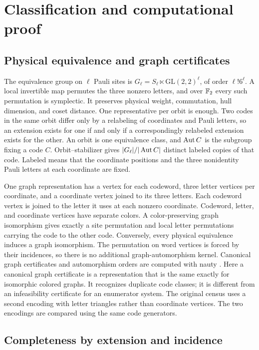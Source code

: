 \section{Classification and computational proof}\label{sec:computation}

\subsection{Physical equivalence and graph certificates}\label{sec:classification}

The equivalence group on \(\ell\) Pauli sites is
\(G_\ell=S_\ell\ltimes\mathrm{GL}(2,2)^\ell\), of order
\(\ell!6^\ell\). A local invertible map permutes the three nonzero
letters, and over \(\mathbb F_2\) every such permutation is symplectic.
It preserves physical weight, commutation, hull dimension, and coset
distance. One representative per orbit is enough.
Two codes in the same orbit differ only by a relabeling of coordinates
and Pauli letters, so an extension exists for one if and only if a
correspondingly relabeled extension exists for the other. An orbit is
one equivalence class, and \(\operatorname{Aut} C\) is the subgroup fixing a code
\(C\). Orbit--stabilizer gives \(|G_\ell|/|\operatorname{Aut} C|\)
distinct labeled copies of that code.
Labeled means that the coordinate positions and the three nonidentity
Pauli letters at each coordinate are fixed.

One graph representation has a vertex for each codeword,
three letter vertices per coordinate, and a coordinate vertex joined to
its three letters. Each codeword vertex is joined to the letter it uses
at each nonzero coordinate. Codeword, letter, and coordinate vertices
have separate colors.
A color-preserving graph isomorphism gives exactly a site permutation and
local letter permutations carrying the code to the other code.
Conversely, every physical equivalence induces a graph isomorphism.
The permutation on word vertices is forced by their incidences, so there
is no additional graph-automorphism kernel. Canonical graph certificates
and automorphism orders are computed with nauty \cite{nauty}.
Here a canonical graph certificate is a representation that is the same
exactly for isomorphic colored graphs. It recognizes duplicate code
classes; it is different from an infeasibility certificate for an
enumerator system.
The original census uses a second encoding with letter triangles rather
than coordinate vertices. The two encodings are compared using the same code generators.

\subsection{Completeness by extension and incidence}

